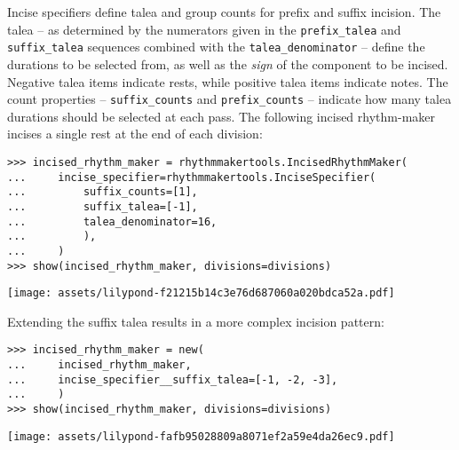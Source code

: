 \noindent Incise specifiers define talea and group counts for prefix and suffix
incision. The talea -- as determined by the numerators given in the
\texttt{prefix\_talea} and \texttt{suffix\_talea} sequences combined with the
\texttt{talea\_denominator} -- define the durations to be selected from, as
well as the \emph{sign} of the component to be incised. Negative talea items
indicate rests, while positive talea items indicate notes. The count properties
-- \texttt{suffix\_counts} and \texttt{prefix\_counts} -- indicate how many
talea durations should be selected at each pass. The following incised
rhythm-maker incises a single  rest at the end of each division:

\begin{comment}
<abjad>
incised_rhythm_maker = rhythmmakertools.IncisedRhythmMaker(
    incise_specifier=rhythmmakertools.InciseSpecifier(
        suffix_counts=[1],
        suffix_talea=[-1],
        talea_denominator=16,
        ),
    )
show(incised_rhythm_maker, divisions=divisions)
</abjad>
\end{comment}

\begin{abjadbookoutput}
\begin{singlespacing}
\vspace{-0.5\baselineskip}
\begin{verbatim}
>>> incised_rhythm_maker = rhythmmakertools.IncisedRhythmMaker(
...     incise_specifier=rhythmmakertools.InciseSpecifier(
...         suffix_counts=[1],
...         suffix_talea=[-1],
...         talea_denominator=16,
...         ),
...     )
>>> show(incised_rhythm_maker, divisions=divisions)
\end{verbatim}
\noindent\texttt{[image: assets/lilypond-f21215b14c3e76d687060a020bdca52a.pdf]}
\end{singlespacing}
\end{abjadbookoutput}

\noindent Extending the suffix talea results in a more complex incision
pattern:

\begin{comment}
<abjad>
incised_rhythm_maker = new(
    incised_rhythm_maker,
    incise_specifier__suffix_talea=[-1, -2, -3],
    )
show(incised_rhythm_maker, divisions=divisions)
</abjad>
\end{comment}

\begin{abjadbookoutput}
\begin{singlespacing}
\vspace{-0.5\baselineskip}
\begin{verbatim}
>>> incised_rhythm_maker = new(
...     incised_rhythm_maker,
...     incise_specifier__suffix_talea=[-1, -2, -3],
...     )
>>> show(incised_rhythm_maker, divisions=divisions)
\end{verbatim}
\noindent\texttt{[image: assets/lilypond-fafb95028809a8071ef2a59e4da26ec9.pdf]}
\end{singlespacing}
\end{abjadbookoutput}

